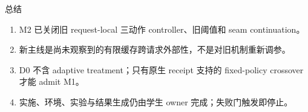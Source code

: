 \documentclass[aspectratio=169,UTF8,11pt]{ctexbeamer}
\begin{document}
\begin{frame}{总结}
  \begin{enumerate}
    \item M2 已关闭旧 request-local 三动作 controller、旧阈值和 seam continuation。
    \item 新主线是尚未观察到的有限缓存跨请求外部性，不是对旧机制重新调参。
    \item D0 不含 adaptive treatment；只有原生 receipt 支持的 fixed-policy crossover 才能 admit M1。
    \item 实施、环境、实验与结果生成仍由学生 owner 完成；失败门触发即停止。
  \end{enumerate}
\end{frame}
\end{document}
